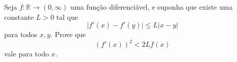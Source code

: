 Seja \(f\colon \mathbb R\to(0,\infty)\) uma função diferenciável, e suponha que existe uma constante \(L>0\) tal que
\[
|f'(x)-f'(y)|\leq L|x-y|
\]
para todos \(x,y\). Prove que
\[
(f'(x))^2<2Lf(x)
\]
vale para todo \(x\).
